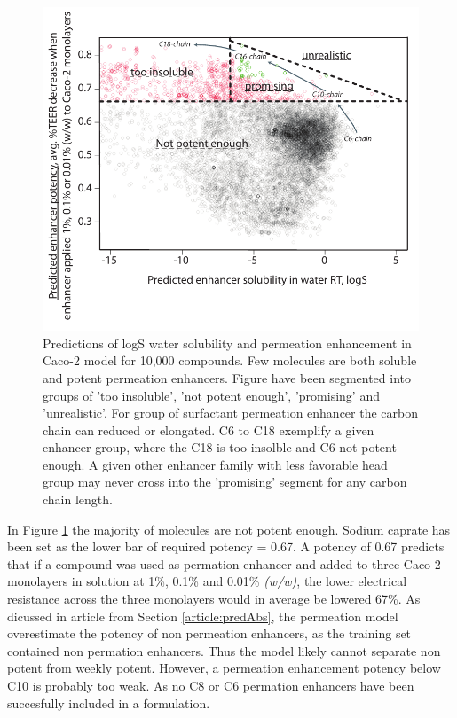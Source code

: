 \begin{figure}[!htbp]
\includegraphics[width=\textwidth,height=\textheight,keepaspectratio]{graphics/screened_molecules3.pdf}
\caption{Predictions of logS water solubility and permeation enhancement in Caco-2 model for 10,000 compounds. Few molecules are both soluble and potent permeation enhancers. Figure have been segmented into groups of 'too insoluble', 'not potent enough', 'promising' and 'unrealistic'. For group of surfactant permeation enhancer the carbon chain can reduced or elongated. C6 to C18 exemplify a given enhancer group, where the C18 is too insolble and C6 not potent enough. A given other enhancer family with less favorable head group may never cross into the 'promising' segment for any carbon chain length.}
\label{predictionsCombined}
\end{figure}

In Figure \ref{predictionsCombined} the majority of molecules are not potent enough. Sodium caprate has been set as the lower bar of required potency = 0.67. A potency of 0.67 predicts that if a compound was used as permation enhancer and added to three Caco-2 monolayers in solution at 1\%, 0.1\% and 0.01\% \textit{(w/w)}, the lower electrical resistance across the three monolayers would in average be lowered 67\%. As dicussed in article from Section \ref{article:predAbs}, the permeation model overestimate the potency of non permeation enhancers, as the training set contained non permation enhancers. Thus the model likely cannot separate non potent from weekly potent. However, a permeation enhancement potency below C10 is probably too weak. As no C8 or C6 permation enhancers have been succesfully included in a formulation.

